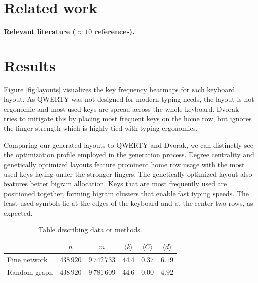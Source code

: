 \documentclass[9pt,twocolumn,twoside]{pnas-report}
\begin{document}
\section*{Related work}

{\bf Relevant literature ($\approx 10$ references).}
\lipsum[5-6]

\nocite{Kle00,Bou05,EB07,New08,For10,New12,FH16,PLC17,PDL18,Pei20}

\section*{Results}

Figure \ref{fig:layouts} visualizes the key frequency heatmaps for each keyboard layout.
As QWERTY was not designed for modern typing needs, the layout is not ergonomic and most used keys are spread across the whole keyboard.
Dvorak tries to mitigate this by placing most frequent keys on the home row, but ignores the finger strength which is highly tied with typing ergonomics.

Comparing our generated layouts to QWERTY and Dvorak, we can distinctly see the optimization profile employed in the generation process.
Degree centrality and genetically optimized layouts feature prominent home row usage with the most used keys laying under the stronger fingers.
The genetically optimized layout also features better bigram allocation.
Keys that are most frequently used are positioned together, forming bigram clusters that enable fast typing speeds.
The least used symbols lie at the edges of the keyboard and at the center two rows, as expected.

\begin{table}[h]\centering%
	\caption{Table describing data or methods.}
	\begin{tabular}{lccccc}\toprule
	    & $n$ & $m$ & $\langle k\rangle$ & $\langle C\rangle$ & $\langle d\rangle$ \\\midrule
	    Fine network & $438\,920$ & $9\,742\,733$ & $44.4$ & $0.37$ & $6.19$ \\
	    Random graph & $438\,920$ & $9\,781\,609$ & $44.6$ & $0.00$ & $4.92$ \\\bottomrule
	\end{tabular}
	\label{tbl:example}
\end{table}

\lipsum[2-3]
\end{document}
